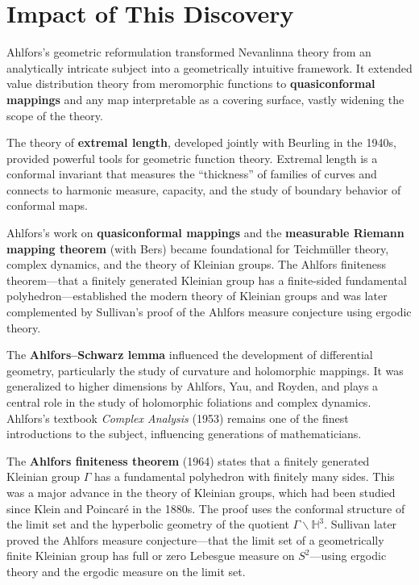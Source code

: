 \section{Impact of This Discovery}

Ahlfors's geometric reformulation transformed Nevanlinna theory from an analytically intricate subject into a geometrically intuitive framework. It extended value distribution theory from meromorphic functions to \textbf{quasiconformal mappings} and any map interpretable as a covering surface, vastly widening the scope of the theory.

The theory of \textbf{extremal length}, developed jointly with Beurling in the 1940s, provided powerful tools for geometric function theory. Extremal length is a conformal invariant that measures the ``thickness'' of families of curves and connects to harmonic measure, capacity, and the study of boundary behavior of conformal maps.

Ahlfors's work on \textbf{quasiconformal mappings} and the \textbf{measurable Riemann mapping theorem} (with Bers) became foundational for Teichm\"{u}ller theory, complex dynamics, and the theory of Kleinian groups. The Ahlfors finiteness theorem---that a finitely generated Kleinian group has a finite-sided fundamental polyhedron---established the modern theory of Kleinian groups and was later complemented by Sullivan's proof of the Ahlfors measure conjecture using ergodic theory.

The \textbf{Ahlfors--Schwarz lemma} influenced the development of differential geometry, particularly the study of curvature and holomorphic mappings. It was generalized to higher dimensions by Ahlfors, Yau, and Royden, and plays a central role in the study of holomorphic foliations and complex dynamics. Ahlfors's textbook \emph{Complex Analysis} (1953) remains one of the finest introductions to the subject, influencing generations of mathematicians.

The \textbf{Ahlfors finiteness theorem} (1964) states that a finitely generated Kleinian group $\Gamma$ has a fundamental polyhedron with finitely many sides. This was a major advance in the theory of Kleinian groups, which had been studied since Klein and Poincar\'{e} in the 1880s. The proof uses the conformal structure of the limit set and the hyperbolic geometry of the quotient $\Gamma \backslash \mathbb{H}^3$. Sullivan later proved the Ahlfors measure conjecture---that the limit set of a geometrically finite Kleinian group has full or zero Lebesgue measure on $S^2$---using ergodic theory and the ergodic measure on the limit set.

